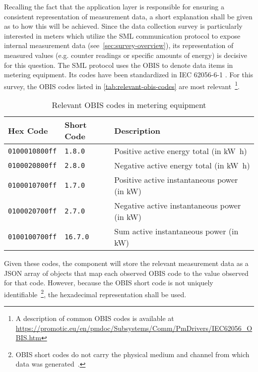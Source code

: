 Recalling the fact that the application layer is responsible for ensuring a consistent representation of measurement data, a short explanation shall be given as to how this will be achieved. Since the data collection survey is particularly interested in meters which utilize the \acf{SML} communication protocol to expose internal measurement data (see~\autoref{sec:survey-overview}), its representation of measured values (e.g. counter readings or specific amounts of energy) is decisive for this question. The \ac{SML} protocol uses the \ac{OBIS} to denote data items in metering equipment. Its codes have been standardized in \acs{IEC} 62056-6-1 \cite{iec2017obis}. For this survey, the \ac{OBIS} codes listed in \autoref{tab:relevant-obis-codes} are most relevant~\footnote{A description of common \acs{OBIS} codes is available at \url{https://promotic.eu/en/pmdoc/Subsystems/Comm/PmDrivers/IEC62056_OBIS.htm}}.

\begin{table}[hbt]
	\centering
  	\begin{tabularx}{\textwidth}{|l|l|X|}
		\hline
		\textbf{Hex Code} & \textbf{Short Code} & \textbf{Description} \\
	    \hline
	    \texttt{0100010800ff} & \texttt{1.8.0} & Positive active energy total (in \si{\kilo\watt\hour}) \\
	    	\texttt{0100020800ff} & \texttt{2.8.0} & Negative active energy total (in \si{\kilo\watt\hour}) \\
	    \texttt{0100010700ff} & \texttt{1.7.0} & Positive active instantaneous power (in \si{\kilo\watt}) \\
	    \texttt{0100020700ff} & \texttt{2.7.0} & Negative active instantaneous power (in \si{\kilo\watt}) \\
	    	\texttt{0100100700ff} & \texttt{16.7.0} & Sum active instantaneous power (in \si{\kilo\watt}) \\
	    	\hline
	\end{tabularx}
  	\caption{Relevant \acs*{OBIS} codes in metering equipment}
  	\label{tab:relevant-obis-codes}
\end{table}

\FloatBarrier

Given these codes, the component will store the relevant measurement data as a \acs{JSON} array of objects that map each observed \acs{OBIS} code to the value observed for that code. However, because the \acs{OBIS} short code is not uniquely identifiable~\footnote{\ac{OBIS} short codes do not carry the physical medium and channel from which data was generated~\cite{iec2017obis}.}, the hexadecimal representation shall be used.


